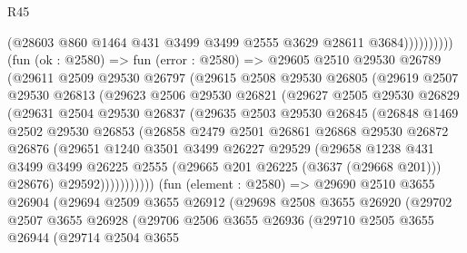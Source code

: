 \begin{lexlean}{R45}
\begin{coremodule}
                          (@28603 @860 @1464 @431 @3499 @3499 @2555 @3629 @28611 @3684))))))))))
        (fun (ok : @2580) =>
        fun (error : @2580) =>
        @29605
          @2510
          @29530
          @26789
          (@29611
            @2509
            @29530
            @26797
            (@29615
              @2508
              @29530
              @26805
              (@29619
                @2507
                @29530
                @26813
                (@29623
                  @2506
                  @29530
                  @26821
                  (@29627
                    @2505
                    @29530
                    @26829
                    (@29631
                      @2504
                      @29530
                      @26837
                      (@29635
                        @2503
                        @29530
                        @26845
                        (@26848
                          @1469
                          @2502
                          @29530
                          @26853
                          (@26858
                            @2479
                            @2501
                            @26861
                            @26868
                            @29530
                            @26872
                            @26876
                            (@29651
                              @1240
                              @3501
                              @3499
                              @26227
                              @29529
                              (@29658
                                @1238
                                @431
                                @3499
                                @3499
                                @26225
                                @2555
                                (@29665 @201 @26225 (@3637 (@29668 @201)))
                                @28676)
                              @29592)))))))))))
        (fun (element : @2580) =>
        @29690
          @2510
          @3655
          @26904
          (@29694
            @2509
            @3655
            @26912
            (@29698
              @2508
              @3655
              @26920
              (@29702
                @2507
                @3655
                @26928
                (@29706
                  @2506
                  @3655
                  @26936
                  (@29710
                    @2505
                    @3655
                    @26944
                    (@29714
                      @2504
                      @3655

\end{coremodule}
\end{lexlean}
